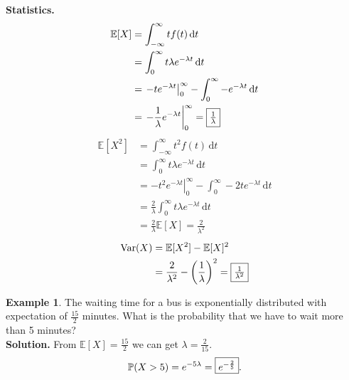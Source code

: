 \documentclass[a4paper,11pt]{amsbook}
\theoremstyle{definition}
\newtheorem{example}{\hspace{-2em} \color{darkblue} Example}[chapter]
\theoremstyle{remark}
\newcommand{\E}{\mathbb{E}}
\renewcommand{\P}{\mathbb{P}}
\DeclareMathOperator\Var{Var}
\newcommand\0{\varnothing}
\newcommand\dt[1][t]{\,\mathrm{d}#1}
\begin{document}
    \textbf{Statistics.} \begin{align*}
        \E[X]&=\int_{-\infty}^{\infty}tf(t)\dt \\
        &=\int_{0}^{\infty}t\lambda e^{-\lambda t}\dt \\
        &=\left.-te^{-\lambda t}\right|_0^\infty-\int_{0}^{\infty}-e^{-\lambda t}\dt \\
        &=\left.-\frac{1}{\lambda}e^{-\lambda t}\right|_0^\infty=\fbox{$\frac{1}{\lambda}$}
    \end{align*}
    \begin{align*}
        \E[X^2]&=\int_{-\infty}^{\infty}t^2f(t)\dt \\
        &=\int_{0}^{\infty}t\lambda e^{-\lambda t}\dt \\
        &=\left.-t^2e^{-\lambda t}\right|_0^\infty-\int_{0}^{\infty}-2te^{-\lambda t}\dt \\
        &=\frac2\lambda\int_{0}^{\infty}t\lambda e^{-\lambda t}\dt \\
        &=\frac2\lambda\E[X]=\frac{2}{\lambda^2}
    \end{align*}
    \begin{align*}
        \Var(X)&=\E[X^2]-\E[X]^2 \\
        &=\frac{2}{\lambda^2}-\left(\frac{1}{\lambda}\right)^2=\fbox{$\frac{1}{\lambda^2}$}
    \end{align*}

    \begin{example}
        The waiting time for a bus is exponentially distributed with expectation of $\frac{15}{2}$ minutes.
        What is the probability that we have to wait more than 5 minutes?\\
        \textbf{Solution.} From $\E[X]=\frac{15}{2}$ we can get $\lambda=\frac{2}{15}$.
        $$\P(X>5)=e^{-5\lambda}=\fbox{$e^{-\frac25}$}.$$
    \end{example}
\end{document}
